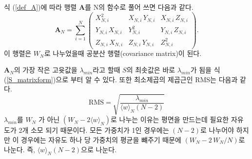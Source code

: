 \documentclass[chapter,a4paper,10pt]{oblivoir}
\begin{document}
식 (\ref{def_A})에 따라 행렬 $\mathbf{A}$를 N의 함수로 풀어 쓰면 다음과 같다.
\begin{equation} \label{matrix_A}
\mathbf{A}_N = \sum_{i=1}^N\left( \begin{array}{ccc}
  X_{N,i}^2 & X_{N,i}\,Y_{N,i} & X_{N,i}\,Z_{N,i} \\
  Y_{N,i}\,X_{N,i} & Y_{N,i}^2 & Y_{N,i}\,Z_{N,i} \\
  Z_{N,i}\,X_{N,i} & Z_{N,i}\,Y_{N,i} & Z_{N,i}^2
\end{array} \right).
\end{equation}
이 행렬은 $W_N$로 나누었을때 공분산 행렬(covariance matrix)이 된다.

$\mathbf{A}_N$의 가장 작은 고윳값을 $\lambda _{min}$라고 할때 $S$의 최솟값은
바로 $\lambda _{min}$가 됨을 식 (\ref{S_matrixform})으로 부터 알 수 있다.
또한 최소제곱의 제곱근인 RMS는 다음과 같다.
\begin{equation}
\mathrm{RMS} = \sqrt{\frac{\lambda_{min}}
{\langle w\rangle_N (N-2)}}
\end{equation}
$\lambda _{min}$를 $W_N$ 가 아닌 $(W_N - 2\langle w\rangle_N)$로 나누는
이유는 평면을 만드는데 필요한 자유도가 2개 소모 되기 때문이다.
모든 가중치가 1인 경우에는 $(N-2)$로 나누어야 하지만 이 경우에는
자유도 하나 당 가중치의 평균을 뺴주기 때문에
$(W_N - 2\,W_N/N)$로 나눈다.  즉, $\langle w\rangle_N (N-2)$으로 나눈다.
\end{document}
